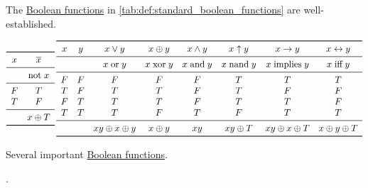 \begin{definition}\label{def:standard_boolean_functions}
  The \hyperref[def:boolean_function]{Boolean functions} in \cref{tab:def:standard_boolean_functions} are well-established.

  \begin{table}
    \begin{equation*}
      \begin{array}{*{2}{c}}
        \toprule
        x & \oline{x}  \\
        \midrule
          & \T{not} x  \\
        \midrule
        F & T          \\
        T & F          \\
        \midrule
          & x \oplus T \\
        \bottomrule
      \end{array}
      \thinspace
      \begin{array}{*{8}{c}}
        \toprule
        x & y & x \vee y             & x \oplus y  & x \wedge y  & x \uparrow y & x \rightarrow y      & x \leftrightarrow y \\
        \midrule
          &   & x \T{or} y           & x \T{xor} y & x \T{and} y & x \T{nand} y & x \T{implies} y      & x \T{iff} y         \\
        \midrule
        F & F & F                    & F           & F           & T            & T                    & T                   \\
        T & F & T                    & T           & F           & T            & F                    & F                   \\
        F & T & T                    & T           & F           & T            & T                    & F                   \\
        T & T & T                    & F           & T           & F            & T                    & T                   \\
        \midrule
          &   & xy \oplus x \oplus y & x \oplus y  & xy          & xy \oplus T  & xy \oplus x \oplus T & x \oplus y \oplus T \\
        \bottomrule
      \end{array}
    \end{equation*}
    \caption{Several important \hyperref[def:boolean_function]{Boolean functions}.}\label{tab:def:standard_boolean_functions}.
  \end{table}


\end{definition}
